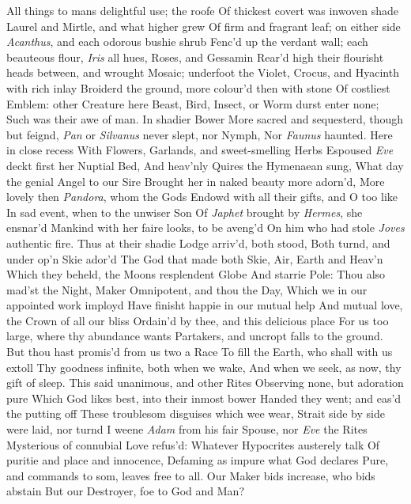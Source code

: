 \documentclass[11pt]{book}
\newcounter {first}
\begin{document}
All things to mans delightful use; the roofe 
Of thickest covert was inwoven shade 
Laurel and Mirtle, and what higher grew 
Of firm and fragrant leaf; on either side 
\textit{Acanthus}, and each odorous bushie shrub 
Fenc'd up the verdant wall; each beauteous flour, 
\textit{Iris} all hues, Roses, and Gessamin 
Rear'd high their flourisht heads between, and wrought 
Mosaic; underfoot the Violet, 
Crocus, and Hyacinth with rich inlay 
Broiderd the ground, more colour'd then with stone 
Of costliest Emblem: other Creature here 
Beast, Bird, Insect, or Worm durst enter none; 
Such was their awe of man.  In shadier Bower 
More sacred and sequesterd, though but feignd, 
\textit{Pan} or \textit{Silvanus} never slept, nor Nymph, 
Nor \textit{Faunus} haunted.  Here in close recess 
With Flowers, Garlands, and sweet-smelling Herbs 
Espoused \textit{Eve} deckt first her Nuptial Bed, 
And heav'nly Quires the Hymenaean sung, 
What day the genial Angel to our Sire 
Brought her in naked beauty more adorn'd, 
More lovely then \textit{Pandora}, whom the Gods 
Endowd with all their gifts, and O too like 
In sad event, when to the unwiser Son 
Of \textit{Japhet} brought by \textit{Hermes}, she ensnar'd 
Mankind with her faire looks, to be aveng'd 
On him who had stole \textit{Joves} authentic fire. 
\quad Thus at their shadie Lodge arriv'd, both stood, 
Both turnd, and under op'n Skie ador'd 
The God that made both Skie, Air, Earth and Heav'n 
Which they beheld, the Moons resplendent Globe 
And starrie Pole: Thou also mad'st the Night, 
Maker Omnipotent, and thou the Day, 
Which we in our appointed work imployd 
Have finisht happie in our mutual help 
And mutual love, the Crown of all our bliss 
Ordain'd by thee, and this delicious place 
For us too large, where thy abundance wants 
Partakers, and uncropt falls to the ground. 
But thou hast promis'd from us two a Race 
To fill the Earth, who shall with us extoll 
Thy goodness infinite, both when we wake, 
And when we seek, as now, thy gift of sleep. 
\quad This said unanimous, and other Rites 
Observing none, but adoration pure 
Which God likes best, into their inmost bower 
Handed they went; and eas'd the putting off 
These troublesom disguises which wee wear, 
Strait side by side were laid, nor turnd I weene 
\textit{Adam} from his fair Spouse, nor \textit{Eve} the Rites 
Mysterious of connubial Love refus'd: 
Whatever Hypocrites austerely talk 
Of puritie and place and innocence, 
Defaming as impure what God declares 
Pure, and commands to som, leaves free to all. 
Our Maker bids increase, who bids abstain 
But our Destroyer, foe to God and Man? 
\end{document}
